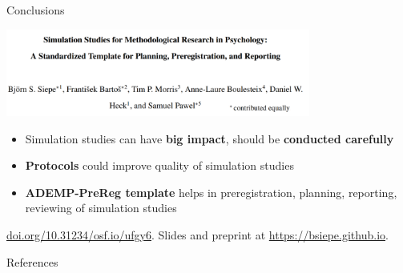 \documentclass[english, 12pt, aspectratio=169]{beamer}
\begin{document}
\begin{frame}{Conclusions}

  \begin{block}{}
    \centering
    \includegraphics[width = 0.75\textwidth,frame]{pics/siepeetal.png}

    \begin{itemize}
    \pause
      \item Simulation studies can have \alert{\textbf{big impact}}, should be
            \alert{\textbf{conducted carefully}}
      \pause
      \item \alert{\textbf{Protocols}} could improve quality of simulation studies
      \pause
      \item \alert{\textbf{ADEMP-PreReg template}} helps in preregistration,
            planning, reporting, reviewing of simulation studies
    \end{itemize}
  \end{block}

  {\tiny \color{gray} \href{https://doi.org/10.31234/osf.io/ufgy6}{doi.org/10.31234/osf.io/ufgy6}. Slides and preprint at \href{https://bsiepe.github.io}{https://bsiepe.github.io}.}
\end{frame}

\begin{frame}[allowframebreaks]{References}
\scriptsize
  
  
\end{frame}
\end{document}
